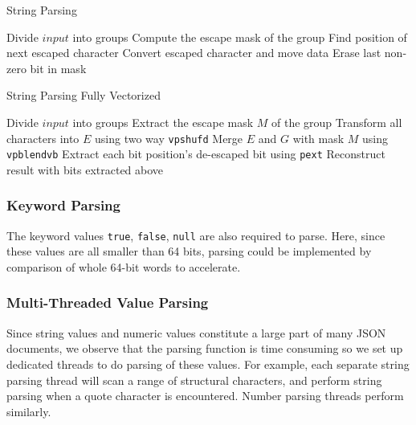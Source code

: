 \documentclass[11pt]{article}
\begin{document}
\begin{algorithm}
\caption{String Parsing}\label{alg:string_parsing}
\begin{algorithmic}[1]
\State Divide $\mathit{input}$ into groups
    \State Compute the escape mask of the group
        \State Find position of next escaped character
        \State Convert escaped character and move data
        \State Erase last non-zero bit in mask
    \EndWhile
\EndFor
\State \Return
\EndProcedure
\end{algorithmic}
\end{algorithm}

\begin{algorithm}
\caption{String Parsing Fully Vectorized}\label{alg:string_parsing_fullavx}
\begin{algorithmic}[1]
\State Divide $\mathit{input}$ into groups
    \State Extract the escape mask $M$ of the group
    \State Transform all characters into $E$ using two way \texttt{vpshufd}
    \State Merge $E$ and $G$ with mask $M$ using \texttt{vpblendvb}
    \State Extract each bit position's de-escaped bit using \texttt{pext}
    \State Reconstruct result with bits extracted above
\EndFor
\State \Return
\EndProcedure
\end{algorithmic}
\end{algorithm}

\subsubsection{Keyword Parsing}
The keyword values \texttt{true}, \texttt{false}, \texttt{null} are also required to parse. Here, since these values are all smaller than 64 bits, parsing could be implemented by comparison of whole 64-bit words to accelerate.

\subsubsection{Multi-Threaded Value Parsing}
Since string values and numeric values constitute a large part of many JSON documents, we observe that the parsing function is time consuming so we set up dedicated threads to do parsing of these values. For example, each separate string parsing thread will scan a range of structural characters, and perform string parsing when a quote character is encountered. Number parsing threads perform similarly.
\end{document}
